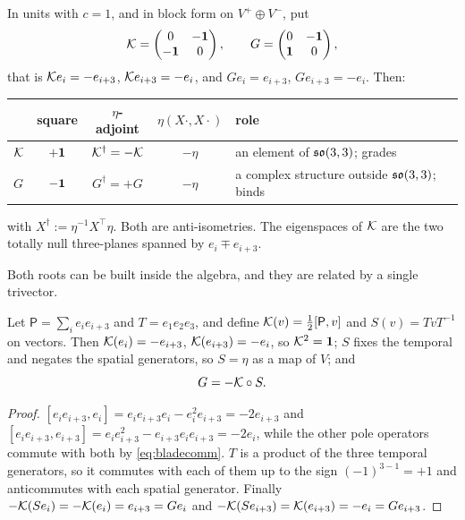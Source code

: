 \begin{proposition}
\label{prop:twoK}
In units with $c=1$, and in block form on $V^+\oplus V^-$, put
\[
\mathcal K=\begin{pmatrix}0&-\mathbf 1\\ -\mathbf 1&0\end{pmatrix},\qquad
G=\begin{pmatrix}0&-\mathbf 1\\ \mathbf 1&0\end{pmatrix},
\]
that is $\mathcal K e_i=-e_{i+3}$, $\mathcal K e_{i+3}=-e_i$, and $Ge_i=e_{i+3}$, $Ge_{i+3}=-e_i$. Then:
\begin{center}
\begin{tabular}{@{}lcccl@{}}
\toprule
& square & $\eta$-adjoint & $\eta(X\cdot,X\cdot)$ & role\\
\midrule
$\mathcal K$ & $+\mathbf 1$ & $\mathcal K^\dagger=-\mathcal K$ & $-\eta$ & an element of $\mathfrak{so}(3,3)$; grades\\
$G$ & $-\mathbf 1$ & $G^\dagger=+G$ & $-\eta$ & a complex structure outside $\mathfrak{so}(3,3)$; binds\\
\bottomrule
\end{tabular}
\end{center}
with $X^\dagger:=\eta^{-1}X^{\!\top}\eta$. Both are anti-isometries. The eigenspaces of $\mathcal K$ are the two totally null three-planes
spanned by $e_i\mp e_{i+3}$.
\end{proposition}

Both roots can be built inside the algebra, and they are related by a single trivector.

\begin{lemma}
\label{lem:Gclifford}
Let $\mathsf P=\sum_i e_ie_{i+3}$ and $T=e_1e_2e_3$, and define $\mathcal K(v)=\tfrac12[\mathsf P,v]$ and $S(v)=TvT^{-1}$ on vectors. Then
$\mathcal K(e_i)=-e_{i+3}$, $\mathcal K(e_{i+3})=-e_i$, so $\mathcal K^2=\mathbf 1$; $S$ fixes the temporal and negates the spatial generators, so $S=\eta$ as a
map of $V$; and
\[
G=-\mathcal K\circ S .
\]
\end{lemma}

\begin{proof}
$[e_ie_{i+3},e_i]=e_ie_{i+3}e_i-e_i^2e_{i+3}=-2e_{i+3}$ and $[e_ie_{i+3},e_{i+3}]=e_ie_{i+3}^2-e_{i+3}e_ie_{i+3}=-2e_i$, while the
other pole operators commute with both by \eqref{eq:bladecomm}. $T$ is a product of the three temporal generators, so it
commutes with each of them up to the sign $(-1)^{3-1}=+1$ and anticommutes with each spatial generator. Finally
$-\mathcal K(S e_i)=-\mathcal K(e_i)=e_{i+3}=Ge_i$ and $-\mathcal K(Se_{i+3})=\mathcal K(e_{i+3})=-e_i=Ge_{i+3}$.
\end{proof}

